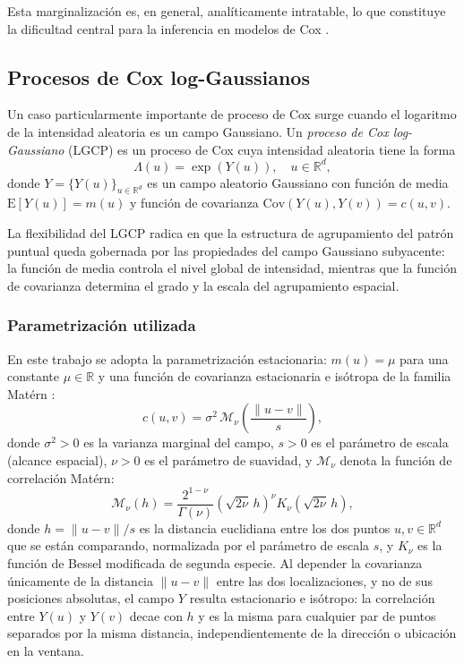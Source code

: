 \documentclass[a4paper,fleqn]{cas-sc}
\numberwithin{equation}{section}
\begin{document}
Esta marginalizaci\'on es, en general, anal\'iticamente intratable, lo que
constituye la dificultad central para la inferencia en modelos de Cox
\citep{MollerWaagepetersen2004}.

\subsection{Procesos de Cox log-Gaussianos}
\label{sec:lgcp_theory}

Un caso particularmente importante de proceso de Cox surge cuando el logaritmo de la intensidad aleatoria es un campo Gaussiano. Un \emph{proceso de Cox log-Gaussiano} (LGCP) \citep{Moller1998} es un proceso de Cox cuya intensidad aleatoria tiene la forma
\begin{equation}
    \Lambda(u) = \exp(Y(u)), \quad u\in\mathbb{R}^d,
    \label{eq:lgcp_intensity}
\end{equation}
donde $Y=\{Y(u)\}_{u\in\mathbb{R}^d}$ es un campo aleatorio Gaussiano con
funci\'on de media $\mathrm{E}[Y(u)]=m(u)$ y funci\'on de covarianza
$\mathrm{Cov}(Y(u),Y(v))=c(u,v)$.

La flexibilidad del LGCP radica en que la estructura de agrupamiento del
patr\'on puntual queda gobernada por las propiedades del campo Gaussiano
subyacente: la funci\'on de media controla el nivel global de intensidad,
mientras que la funci\'on de covarianza determina el grado y la escala del
agrupamiento espacial.

\subsubsection{Parametrizaci\'on utilizada}

En este trabajo se adopta la parametrizaci\'on estacionaria: $m(u)=\mu$ para una constante $\mu\in\mathbb{R}$ y una funci\'on de covarianza estacionaria e is\'otropa de la familia Mat\'ern \citep{Matern1960, Stein1999}:
\begin{equation}
    c(u,v) = \sigma^2\,\mathcal{M}_{\nu}\!\left(\frac{\|u-v\|}{s}\right),
    \label{eq:cov_matern}
\end{equation}
donde $\sigma^2>0$ es la varianza marginal del campo, $s>0$ es el par\'ametro
de escala (alcance espacial), $\nu>0$ es el par\'ametro de suavidad, y
$\mathcal{M}_{\nu}$ denota la funci\'on de correlaci\'on Mat\'ern:
\begin{equation}
    \mathcal{M}_{\nu}(h) =
    \frac{2^{1-\nu}}{\Gamma(\nu)}\left(\sqrt{2\nu}\,h\right)^{\nu}
    K_{\nu}\!\left(\sqrt{2\nu}\,h\right),
    \label{eq:matern_corr}
\end{equation}
donde $h=\|u-v\|/s$ es la distancia euclidiana entre los dos puntos
$u,v\in\mathbb{R}^d$ que se est\'an comparando, normalizada por el
par\'ametro de escala $s$, y $K_{\nu}$ es la funci\'on de Bessel modificada
de segunda especie. Al depender la covarianza \'unicamente de la distancia
$\|u-v\|$ entre las dos localizaciones, y no de sus posiciones absolutas, el
campo $Y$ resulta estacionario e is\'otropo: la correlaci\'on entre $Y(u)$
y $Y(v)$ decae con $h$ y es la misma para cualquier par de puntos separados por la misma distancia, independientemente de la direcci\'on o ubicaci\'on en la ventana.
\end{document}
